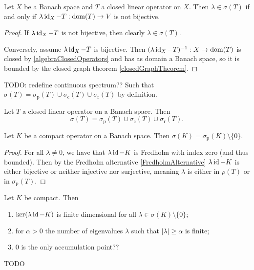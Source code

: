 \begin{proposition}
Let $X$ be a Banach space and $T$ a closed linear operator on $X$. Then $\lambda \in \sigma(T)$ \textup{if and only if} $\lambda \operatorname{id}_X - T: \operatorname{dom}(T) \to V$ is not bijective.
\end{proposition}
\begin{proof}
If $\lambda \operatorname{id}_X - T$ is not bijective, then clearly $\lambda \in \sigma(T)$.

Conversely, assume $\lambda \operatorname{id}_X - T$ is bijective. Then $(\lambda \operatorname{id}_X - T)^{-1}: X\to \operatorname{dom}(T)$ is closed by \ref{algebraClosedOperators} and has as domain a Banach space, so it is bounded by the closed graph theorem \ref{closedGraphTheorem}.
\end{proof}
TODO: redefine continuous spectrum?? Such that $\sigma(T) = \sigma_\text{p}(T) \cup \sigma_\text{c}(T) \cup \sigma_\text{r}(T)$ by definition.
\begin{corollary}
Let $T$ a closed linear operator on a Banach space. Then
\[ \sigma(T) = \sigma_\text{p}(T) \cup \sigma_\text{c}(T) \cup \sigma_\text{r}(T). \]
\end{corollary}
\begin{corollary}
Let $K$ be a compact operator on a Banach space. Then $\sigma(K) = \sigma_\text{p}(K)\setminus\{0\}$.
\end{corollary}
\begin{proof}
For all $\lambda\neq 0$, we have that $\lambda\operatorname{id} - K$ is Fredholm with index zero (and thus bounded). Then by the Fredholm alternative \ref{FredholmAlternative} $\lambda\operatorname{id} - K$ is either bijective or neither injective nor surjective, meaning $\lambda$ is either in $\rho(T)$ or in $\sigma_\text{p}(T)$. 
\end{proof}

\begin{proposition} \label{spectrumCompactOperator}
Let $K$ be compact. Then
\begin{enumerate}
\item $\ker(\lambda\operatorname{id}- K)$ is finite dimensional for all $\lambda\in\sigma(K)\setminus\{0\}$;
\item for $\alpha > 0$ the number of eigenvalues $\lambda$ such that $|\lambda|\geq \alpha$ is finite;
\item $0$ is the only accumulation point??
\end{enumerate}
TODO
\end{proposition}

